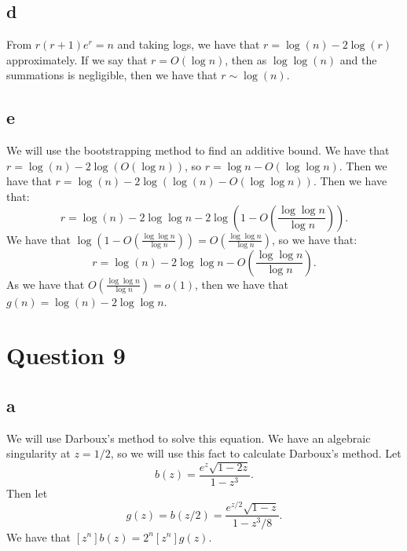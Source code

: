 \documentclass[]{article}
\theoremstyle{definition}
\numberwithin{theorem}{section}
\numberwithin{equation}{section}
\begin{document}
\subsection{d}
From $r (r + 1) e^r = n$ and taking logs, we have that $r = \log(n) - 2\log(r)$ approximately. If we say that $r = O(\log n)$, then as $\log \log (n)$ and the summations is negligible, then we have that $r \sim \log(n)$.

\subsection{e}
We will use the bootstrapping method to find an additive bound. 
We have that $r = \log(n) - 2 \log(O(\log n))$, so $r = \log n - O(\log \log n)$. Then we have that $r = \log(n) - 2 \log(\log (n) - O(\log \log n))$. Then we have that:
\begin{equation}
	r = \log(n) - 2 \log \log n - 2\log \left(1 -  O\left(\frac{\log \log n}{\log n}\right)\right).
\end{equation}
We have that $\log \left(1 -  O\left(\frac{\log \log n}{\log n}\right)\right) = O\left(\frac{\log \log n}{\log n}\right)$, so we have that:
\begin{equation}
	r = \log(n) - 2 \log \log n - O\left(\frac{\log \log n}{\log n}\right).
\end{equation}
As we have that $ O\left(\frac{\log \log n}{\log n}\right) = o(1)$, then we have that $g(n) = \log(n) - 2 \log \log n$. 
\section{Question 9}
\subsection{a}

We will use Darboux's method to solve this equation. We have an algebraic singularity at $z = 1/2$, so we will use this fact to calculate Darboux's method.
Let 
\begin{equation}
	b(z) = \frac{e^z \sqrt{1 - 2z}}{1 - z^3}.
\end{equation}
Then let 
\begin{equation}
	g(z) = b(z/2) = \frac{e^{z/2} \sqrt{1-z}}{1 - z^3/8}.
\end{equation}
We have that $[z^n] b(z) = 2^n [z^n] g(z)$. 
\end{document}
